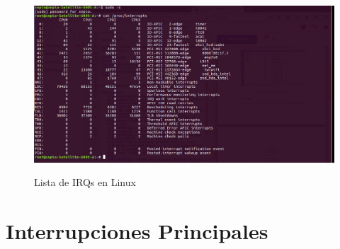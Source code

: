 \documentclass{article}
\begin{document}
\begin{figure}[h]
\centering
\includegraphics[scale=0.3]{linux.png}
\label{Lista de IRQs en Linux}
\caption{Lista de IRQs en Linux}
\end{figure}


\section{Interrupciones Principales}
\end{document}
